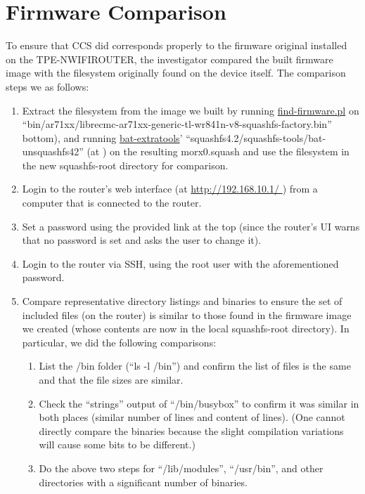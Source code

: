 \section{Firmware Comparison}

To ensure that CCS did corresponds properly to the firmware original
installed on the TPE-NWIFIROUTER, the investigator compared the built
firmware image with the filesystem originally found on the device itself.
The comparison steps we as follows:

\begin{enumerate}
  
\item Extract the filesystem from the image we built by running
  \href{https://gitorious.org/copyleft-org/gpl-compliance-scripts/source/master:find-firmware.pl}{find-firmware.pl}
  on ``bin/ar71xx/librecmc-ar71xx-generic-tl-wr841n-v8-squashfs-factory.bin''
  bottom), and running
  \href{http://www.binaryanalysis.org/en/content/show/download}{bat-extratools}'
  ``squashfs4.2/squashfs-tools/bat-unsquashfs42'' (at ) on the resulting
  morx0.squash and use the filesystem in the new squashfs-root directory for
  comparison.

\item Login to the router's web interface (at \url{http://192.168.10.1/ }) from a computer that is
  connected to the router.
  
\item Set a password using the provided link at the top (since the router's
  UI warns that no password is set and asks the user to change it).
  
\item Login to the router via SSH, using the root user with the
  aforementioned password.
  
\item Compare representative directory listings and binaries to ensure the set of
  included files (on the router) is similar to those found in the firmware image
  we created (whose contents are now in the local squashfs-root directory).  In
  particular, we did the following comparisons:

  \begin{enumerate}
  \item List the /bin folder (``ls -l /bin'') and confirm the list of files is the same
    and that the file sizes are similar.
    
  \item Check the ``strings'' output of ``/bin/busybox'' to confirm it was similar in both
   places (similar number of lines and content of lines).  (One cannot directly
   compare the binaries because the slight compilation variations will cause
   some bits to be different.)
 \item Do the above two steps for ``/lib/modules'', ``/usr/bin'', and other directories with
   a significant number of binaries.
   

\end{enumerate}
\end{enumerate}

